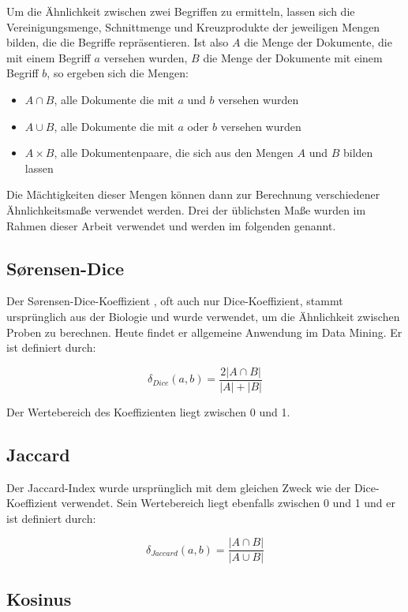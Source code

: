 Um die Ähnlichkeit zwischen zwei Begriffen zu ermitteln, lassen sich die Vereinigungsmenge, Schnittmenge und Kreuzprodukte der jeweiligen Mengen bilden, die die Begriffe repräsentieren. Ist also \(A\) die Menge der Dokumente, die mit einem Begriff \(a\) versehen wurden, \(B\) die Menge der Dokumente mit einem Begriff \(b\), so ergeben sich die Mengen:

\begin{itemize}
    \item \(A \cap B\), alle Dokumente die mit \(a\) und \(b\) versehen wurden
    \item \(A \cup B\), alle Dokumente die mit \(a\) oder \(b\) versehen wurden
    \item \(A \times B\), alle Dokumentenpaare, die sich aus den Mengen \(A\) und \(B\) bilden lassen
\end{itemize}

Die Mächtigkeiten dieser Mengen können dann zur Berechnung verschiedener Ähnlichkeitsmaße verwendet werden. Drei der üblichsten Maße wurden im Rahmen dieser Arbeit verwendet und werden im folgenden genannt.

\subsection{Sørensen-Dice}

Der Sørensen-Dice-Koeffizient \cite{st1948} \cite{ld1945}, oft auch nur Dice-Koeffizient, stammt ursprünglich aus der Biologie und wurde verwendet, um die Ähnlichkeit zwischen Proben zu berechnen. Heute findet er allgemeine Anwendung im Data Mining. Er ist definiert durch:

\[
\delta_{Dice}(a, b) = \frac{2|A \cap B|}{|A|+|B|}
\]

Der Wertebereich des Koeffizienten liegt zwischen \num{0} und \num{1}.

\subsection{Jaccard}

Der Jaccard-Index \cite{pj19012} wurde ursprünglich mit dem gleichen Zweck wie der Dice-Koeffizient verwendet. Sein Wertebereich liegt ebenfalls zwischen \num{0} und \num{1} und er ist definiert durch:

\[
\delta_{Jaccard}(a,b) = \frac{|A \cap B|}{|A \cup B|}
\]

\subsection{Kosinus}

